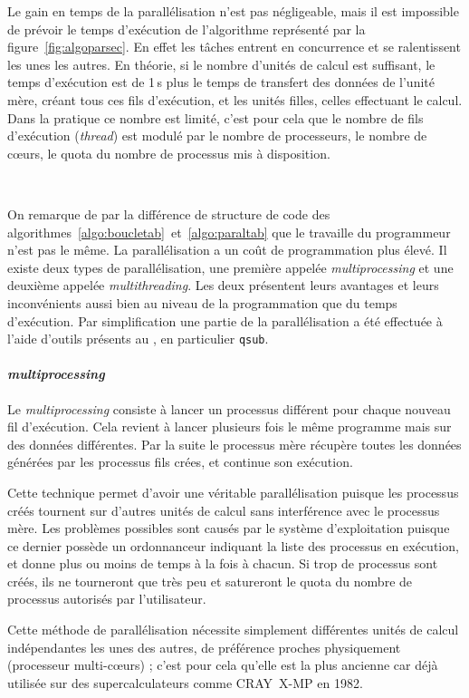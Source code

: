 Le gain en temps de la parallélisation n'est pas négligeable, mais il est impossible de prévoir le temps d'exécution de l'algorithme représenté par la figure~\ref{fig:algoparsec}. En effet les tâches entrent en concurrence et se ralentissent les unes les autres. En théorie, si le nombre d'unités de calcul est suffisant, le temps d'exécution est de 1\,s plus le temps de transfert des données de l'unité mère, créant tous ces fils d'exécution, et les unités filles, celles effectuant le calcul. Dans la pratique ce nombre est limité, c'est pour cela que le nombre de fils d'exécution (\emph{thread}) est modulé par le nombre de processeurs, le nombre de c\oe{}urs, le quota du nombre de processus mis à disposition.

\

On remarque de par la différence de structure de code des algorithmes~\ref{algo:boucletab}~et~\ref{algo:paraltab} que le travaille du programmeur n'est pas le même. La parallélisation a un coût de programmation plus élevé. Il existe deux types de parallélisation, une première appelée \emph{multiprocessing} et une deuxième appelée \emph{multithreading}. Les deux présentent leurs avantages et leurs inconvénients aussi bien au niveau de la programmation que du temps d'exécution. Par simplification une partie de la parallélisation a été effectuée à l'aide d'outils présents au \CC, en particulier \texttt{qsub}.

			\paragraph{\emph{multiprocessing}}
Le \emph{multiprocessing} consiste à lancer un processus différent pour chaque nouveau fil d'exécution. Cela revient à lancer plusieurs fois le même programme mais sur des données différentes. Par la suite le processus mère récupère toutes les données générées par les processus fils crées, et continue son exécution.

Cette technique permet d'avoir une véritable parallélisation puisque les processus créés tournent sur d'autres unités de calcul sans interférence avec le processus mère. Les problèmes possibles sont causés par le système d'exploitation puisque ce dernier possède un ordonnanceur indiquant la liste des processus en exécution, et donne plus ou moins de temps à la fois à chacun. Si trop de processus sont créés, ils ne tourneront que très peu et satureront le quota du nombre de processus autorisés par l'utilisateur.

Cette méthode de parallélisation nécessite simplement différentes unités de calcul indépendantes les unes des autres, de préférence proches physiquement (processeur multi-c\oe{}urs) ; c'est pour cela qu'elle est la plus ancienne car déjà utilisée sur des supercalculateurs comme CRAY~X-MP en 1982.

